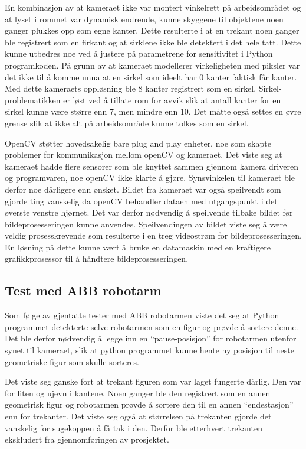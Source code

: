 \documentclass[conference]{IEEEtran}
\begin{document}
        En kombinasjon av at kameraet ikke var montert vinkelrett på arbeidsområdet og at lyset i rommet var dynamisk endrende, kunne skyggene til objektene noen ganger plukkes opp som egne kanter. Dette resulterte i at en trekant noen ganger ble registrert som en firkant og at sirklene ikke ble detektert i det hele tatt. Dette kunne utbedres noe ved å justere på parametrene for sensitivitet i Python programkoden. På grunn av at kameraet modellerer virkeligheten med piksler var det ikke til å komme unna at en sirkel som ideelt har 0 kanter faktisk får kanter. Med dette kameraets oppløsning ble 8 kanter registrert som en sirkel. Sirkel-problematikken er løst ved å tillate rom for avvik slik at antall kanter for en sirkel kunne være større enn 7, men mindre enn 10. Det måtte også settes en øvre grense slik at ikke alt på arbeidsområde kunne tolkes som en sirkel. 

        OpenCV støtter hovedsakelig bare plug and play enheter, noe som skapte problemer for kommunikasjon mellom openCV og kameraet. Det viste seg at kameraet hadde flere sensorer som ble knyttet sammen gjennom kamera driveren og programvaren, noe openCV ikke klarte å gjøre. Synsvinkelen til kameraet ble derfor noe dårligere enn ønsket. Bildet fra kameraet var også speilvendt som gjorde ting vanskelig da openCV behandler dataen med utgangspunkt i det øverste venstre hjørnet. Det var derfor nødvendig å speilvende tilbake bildet før bildeprosesseringen kunne anvendes. 
        Speilvendingen av bildet viste seg å være veldig prosesskrevende som resulterte i en treg videostrøm for bildeprosesseringen. En løsning på dette kunne vært å bruke en datamaskin med en kraftigere grafikkprosessor til å håndtere bildeprosesseringen. 

    \subsection{Test med ABB robotarm}
        Som følge av gjentatte tester med ABB robotarmen viste det seg at Python programmet detekterte selve robotarmen som en figur og prøvde å sortere denne. Det ble derfor nødvendig å legge inn en “pause-posisjon” for robotarmen utenfor synet til kameraet, slik at python programmet kunne hente ny posisjon til neste geometriske figur som skulle sorteres.

        Det viste seg ganske fort at trekant figuren som var laget fungerte dårlig. Den var for liten og ujevn i kantene. Noen ganger ble den registrert som en annen geometrisk figur og robotarmen prøvde å sortere den til en annen \enquote{endestasjon} enn for trekanter. Det viste seg også at størrelsen på trekanten gjorde det vanskelig for sugekoppen å få tak i den. Derfor ble etterhvert trekanten ekskludert fra gjennomføringen av prosjektet. 
\end{document}
